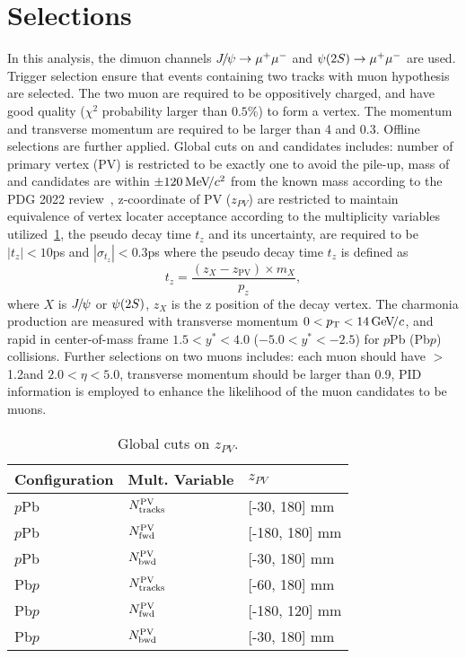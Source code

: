 \section{Selections}
\label{Selections}

In this analysis, the dimuon channels ${{J\mskip -3mu/\mskip -2mu\psi}}\rightarrow \mu^+\mu^-$ and ${\psi{(2S)}}\rightarrow \mu^+\mu^-$ are used. Trigger selection ensure that events containing two tracks with muon hypothesis are selected. The two muon are required to be oppositively charged, and have good quality ($\chi^2$ probability larger than $0.5\%$) to form a vertex. The momentum and transverse momentum are required to be larger than 4 and 0.3\gevc. 
Offline selections are further applied. Global cuts on \jpsi and \psitwos candidates includes: number of primary vertex (PV) is restricted to be exactly one to avoid the pile-up, mass of \jpsi and \psitwos candidates are  within $\pm 120 \text{\,Me\kern -0.1em V\!/}c^2 $ from the known mass according to the PDG 2022 review~\cite{Workman:2022ynf}, z-coordinate of PV ($z_{PV}$) are restricted to maintain equivalence of vertex locater acceptance according to the multiplicity variables utilized~\ref{TablePVZ}, the pseudo decay time $t_z$ and its uncertainty, are required to be $|t_z|<10$ps and $|\sigma_{t_z}|<0.3$ps where the pseudo decay time $t_z$ is defined as
\begin{equation}
    \label{PseudoDecayTime}
    t_z = \frac{(z_{X}-z_{\mathrm{PV}}) \times{} m_X}{p_z},
\end{equation}
where $X$ is ${{J\mskip -3mu/\mskip -2mu\psi}}$ or ${\psi{(2S)}}$, $z_{X}$ is the z position of the decay vertex.
The charmonia production are measured with transverse momentum $0<p_{\mathrm{T}}<14\text{\,Ge\kern -0.1em V\!/}c$, and rapid in center-of-mass frame $1.5<y^*<4.0$ ($-5.0<y^*<-2.5$)  for $p$Pb (Pb$p$) collisions.
Further selections on two muons includes: each muon should have \pt$>$1.2\gevc and $2.0<\eta<5.0$, transverse momentum should be larger than 0.9\gevc, PID information is employed to enhance the likelihood of the muon candidates to be muons.
\begin{table}[H]
\caption{Global cuts on $z_{PV}$.}
\begin{center}
\begin{tabular}{lll}
\hline
\textbf{Configuration} & \textbf{Mult. Variable} & \textbf{$z_{PV}$}\\
\hline
        $p$Pb & $N^{\rm PV}_{\rm tracks}$ & [-30, 180] mm\\
        $p$Pb & $N^{\rm PV}_{\rm fwd}$ & [-180, 180] mm\\
        $p$Pb & $N^{\rm PV}_{\rm bwd}$ & [-30, 180] mm\\
        Pb$p$ & $N^{\rm PV}_{\rm tracks}$ & [-60, 180] mm\\
        Pb$p$ & $N^{\rm PV}_{\rm fwd}$ & [-180, 120] mm\\
        Pb$p$ & $N^{\rm PV}_{\rm bwd}$ & [-30, 180] mm\\
\hline
\end{tabular}
\end{center}
\label{TablePVZ}
\end{table}

